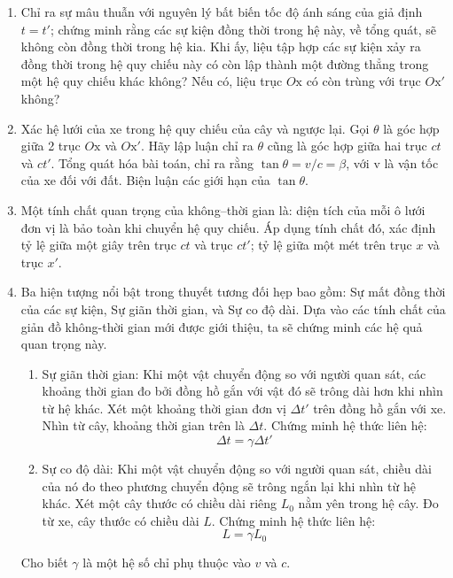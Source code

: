 \begin{enumerate}[label=(\alph*)]
\addtocounter{enumi}{2}
    \item Chỉ ra sự mâu thuẫn với nguyên lý bất biến tốc độ ánh sáng của giả định $t=t'$; chứng minh rằng các sự kiện đồng thời trong hệ này, về tổng quát, sẽ không còn đồng thời trong hệ kia. Khi ấy, liệu tập hợp các sự kiện xảy ra đồng thời trong hệ quy chiếu này có còn lập thành một đường thẳng trong một hệ quy chiếu khác không? Nếu có, liệu trục $O\mathrm{x}$ có còn trùng với trục $O\mathrm{x}'$ không?
    \item Xác hệ lưới của xe trong hệ quy chiếu của cây và ngược lại. Gọi $\theta$ là góc hợp giữa 2 trục $O\mathrm{x}$ và $O\mathrm{x}'$. Hãy lập luận chỉ ra $\theta$ cũng là góc hợp giữa hai trục $c t$ và $c t'$. Tổng quát hóa bài toán, chỉ ra rằng $\tan \theta = v/c = \beta$, với v là vận tốc của xe đối với đất. Biện luận các giới hạn của $\tan \theta$.
    


\newpage

    \item Một tính chất quan trọng của không--thời gian là: diện tích của mỗi ô lưới đơn vị là bảo toàn khi chuyển hệ quy chiếu. Áp dụng tính chất đó, xác định tỷ lệ giữa một giây trên trục $c t$ và trục $c t'$; tỷ lệ giữa một mét trên trục $x$ và trục $x'$.
    \item Ba hiện tượng nổi bật trong thuyết tương đối hẹp bao gồm: Sự mất đồng thời của các sự kiện, Sự giãn thời gian, và Sự co độ dài. Dựa vào các tính chất của giản đồ không-thời gian mới được giới thiệu, ta sẽ chứng minh các hệ quả quan trọng này.
    \begin{enumerate}[label=(\roman*)]
        \item Sự giãn thời gian: Khi một vật chuyển động so với người quan sát, các khoảng thời gian đo bởi đồng hồ gắn với vật đó sẽ trông dài hơn khi nhìn từ hệ khác. Xét một khoảng thời gian đơn vị $\Delta t'$ trên đồng hồ gắn với xe. Nhìn từ cây, khoảng thời gian trên là $\Delta t$. Chứng minh hệ thức liên hệ: $$\Delta t = \gamma \Delta t' $$
        \item Sự co độ dài: Khi một vật chuyển động so với người quan sát, chiều dài của nó đo theo phương chuyển động sẽ trông ngắn lại khi nhìn từ hệ khác. Xét một cây thước có chiều dài riêng $L_0$ nằm yên trong hệ cây. Đo từ xe, cây thước có chiều dài $L$. Chứng minh hệ thức liên hệ: $$L = \gamma L_0$$
    \end{enumerate}
Cho biết $\gamma$ là một hệ số chỉ phụ thuộc vào $v$ và $c$.
\end{enumerate}
\vspace{8pt}